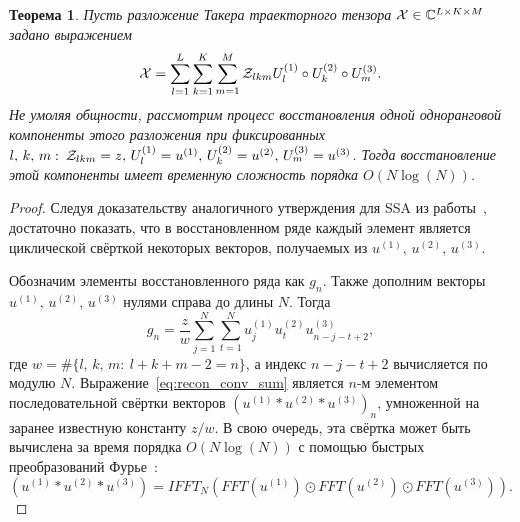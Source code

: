 \documentclass[specialist,
  substylefile = spbu.rtx,
subf,href,colorlinks=true, 12pt]{disser}
\theoremstyle{plain}
\newtheorem{theorem}{Теорема}[section]
\theoremstyle{definition}
\theoremstyle{remark}
\begin{document}
\begin{theorem}\label{theorem:tssa-complexity-recon}
  Пусть разложение Такера траекторного тензора $\mathcal{X} \in
  \mathbb{C}^{L\times K\times M}$
  задано выражением
  \[
    \mathcal{X} = \sum_{l=1}^L\sum_{k=1}^K\sum_{m=1}^M \mathcal{Z}_{lkm} U_{l}^{(1)} \circ
    U_k^{(2)} \circ U_m^{(3)}.
  \]
  Не умоляя общности, рассмотрим процесс восстановления одной одноранговой
  компоненты этого разложения при фиксированных $l,\, k,\, m:\:
  \mathcal{Z}_{lkm} = z,\, U_{l}^{(1)} = u^{(1)},\, U_k^{(2)} = u^{(2)},\,
  U_m^{(3)} = u^{(3)}$.
  Тогда восстановление этой компоненты имеет временную
  сложность порядка $O(N \log(N))$.
\end{theorem}
\begin{proof}
  Следуя доказательству аналогичного утверждения для SSA из
  работы~\cite{Korobeynikov2010}, достаточно показать, что в
  восстановленном ряде каждый элемент является циклической свёрткой
  некоторых векторов, получаемых из $u^{(1)},\, u^{(2)},\, u^{(3)}$.

  Обозначим элементы восстановленного ряда как $g_n$. Также дополним векторы
  $u^{(1)},\,u^{(2)},\,u^{(3)}$ нулями справа до длины $N$.
  Тогда
  \begin{equation}\label{eq:recon_conv_sum}
    g_n = \frac{z}{w}\sum_{j=1}^{N}\sum_{t=1}^{N}u_j^{(1)} u_t^{(2)} u_{n
    - j - t + 2}^{(3)},
  \end{equation}
  где $w = \#\{l,\,k,\,m:\: l+k+m-2=n\}$, а индекс $n - j - t + 2$
  вычисляется по модулю $N$. Выражение~\eqref{eq:recon_conv_sum}
  является $n$-м элементом последовательной свёртки векторов
  $(u^{(1)}*u^{(2)}*u^{(3)})_n$, умноженной на заранее известную
  константу $z/w$. В свою очередь, эта свёртка может быть вычислена
  за время порядка $O(N\log(N))$ с помощью быстрых преобразований
  Фурье~\cite{Briggs1995}:
  \begin{equation}\label{eq:fft-conv-rec}
    \left(u^{(1)}*u^{(2)}*u^{(3)}\right) = IFFT_N\left(FFT(u^{(1)})
    \odot FFT(u^{(2)}) \odot FFT(u^{(3)})\right).
  \end{equation}
\end{proof}
\end{document}
